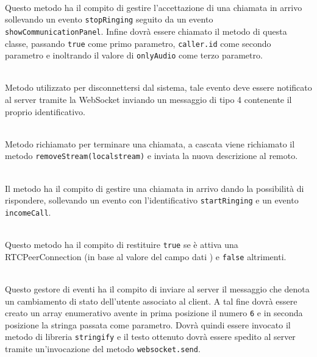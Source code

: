 \begin{description}
  \item{}\\
  Questo metodo ha il compito di gestire l'accettazione di una chiamata in arrivo sollevando un evento \verb'stopRinging' seguito da un evento \verb'showCommunicationPanel'. Infine dovrà essere chiamato il metodo  di questa classe, passando \verb'true' come primo parametro, \verb'caller.id' come secondo parametro e inoltrando il valore di \verb'onlyAudio' come terzo parametro. 

  \item{}\\
  Metodo utilizzato per disconnettersi dal sistema, tale evento deve essere notificato al server tramite la WebSocket inviando un messaggio di tipo 4 contenente il proprio identificativo.

  \item{}\\
  Metodo richiamato per terminare una chiamata, a cascata viene richiamato il metodo \verb'removeStream(localstream)' e inviata la nuova descrizione al  remoto.
  
  \item{}\\
  Il metodo ha il compito di gestire una chiamata in arrivo dando la possibilità di rispondere, sollevando un evento con l'identificativo \verb'startRinging' e un evento \verb'incomeCall'.
  
  \item{}\\
  Questo metodo ha il compito di restituire \verb'true' se è attiva una RTCPeerConnection (in base al valore del campo dati ) e \verb'false' altrimenti.
  
  \item{}\\
  Questo gestore di eventi ha il compito di inviare al server il messaggio che denota un cambiamento di stato dell'utente associato al client. A tal fine dovrà essere creato un array enumerativo avente in prima posizione il numero \verb'6' e in seconda posizione la stringa passata come parametro. Dovrà quindi essere invocato il metodo di libreria \verb'stringify' e il testo ottenuto dovrà essere spedito al server tramite un'invocazione del metodo \verb'websocket.send'.
  

\end{description}
